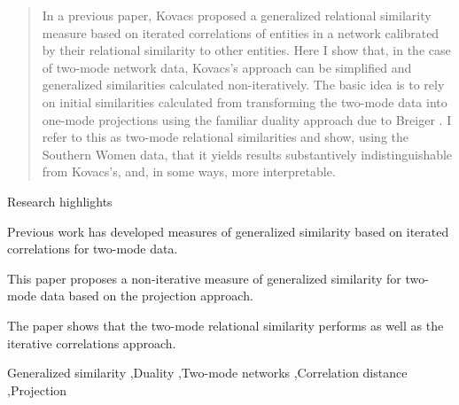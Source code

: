 \documentclass[a4paper,fleqn]{cas-sc}
\begin{document}
\begin{abstract}
In a previous paper, Kovacs \citeyearpar{kovacs2010} proposed a generalized relational similarity measure based on iterated correlations of entities in a network calibrated by their relational similarity to other entities. Here I show that, in the case of two-mode network data, Kovacs's approach can be simplified and generalized similarities calculated non-iteratively. The basic idea is to rely on initial similarities calculated from transforming the two-mode data into one-mode projections using the familiar duality approach due to Breiger \citeyearpar{breiger1974}. I refer to this as two-mode relational similarities and show, using the Southern Women data, that it yields results substantively indistinguishable from Kovacs's, and, in some ways, more interpretable. 
\end{abstract}


 Research highlights
\begin{highlights}
    \item Previous work has developed measures of generalized similarity based on iterated correlations for two-mode data.
    \item This paper proposes a non-iterative measure of generalized similarity for two-mode data based on the projection approach.
    \item The paper shows that the two-mode relational similarity performs as well as the iterative correlations approach. 
\end{highlights}

\begin{keywords}
Generalized similarity \sep Duality \sep Two-mode networks \sep Correlation distance \sep Projection
\end{keywords}


\maketitle
\newpage
\end{document}
